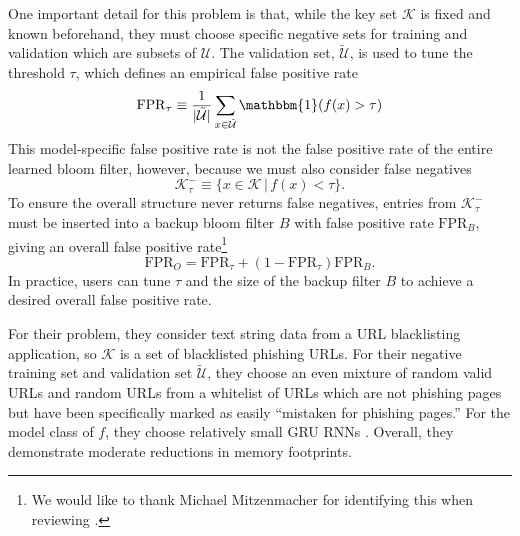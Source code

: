 \documentclass{article}
\newcommand{\tU}{\tilde{\mathcal{U}}}
\begin{document}
One important detail for this problem is that, while the key set $\mathcal{K}$
is fixed and known beforehand, they must choose specific negative sets for
training and validation which are subsets of $\mathcal{U}$. The validation set,
$\tU$, is used to tune the threshold $\tau$, which defines an empirical false
positive rate \begin{equation}
  \mathrm{FPR}_\tau \equiv \frac{1}{|\tU|} \sum_{x \in \tU} \mathbbm{1}(f(x) > \tau)
\end{equation}
This model-specific false positive rate is not the false positive rate of the
entire learned bloom filter, however, because we must also consider false
negatives \begin{equation}
  \mathcal{K}_{\tau}^{-} \equiv \{ x \in \mathcal{K} \,|\, f(x) < \tau \}.
\end{equation}
To ensure the overall structure never returns false negatives, entries from
$\mathcal{K}_{\tau}^{-}$ must be inserted into a backup bloom filter $B$ with
false positive rate $\mathrm{FPR}_B$, giving an overall false positive
rate\footnote{We would like to thank Michael Mitzenmacher for identifying this
when reviewing \citet{kraska2018case}.} \begin{equation}
  \mathrm{FPR}_O = \mathrm{FPR}_\tau + (1 - \mathrm{FPR}_\tau)\mathrm{FPR}_B.
\end{equation}
In practice, users can tune $\tau$ and the size of the backup filter $B$ to
achieve a desired overall false positive rate.

For their problem, they consider text string data from a URL blacklisting
application, so $\mathcal{K}$ is a set of blacklisted phishing URLs. For their
negative training set and validation set $\tU$, they choose an even mixture of
random valid URLs and random URLs from a whitelist of URLs which are not
phishing pages but have been specifically marked as easily ``mistaken for
phishing pages.'' For the model class of $f$, they choose relatively small GRU
RNNs \citep{cho2014learning}. Overall, they demonstrate moderate reductions in
memory footprints.
\end{document}

